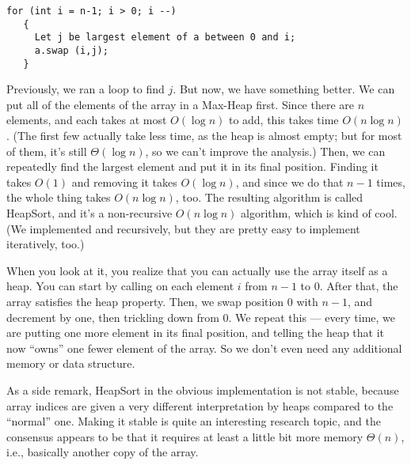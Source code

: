 \begin{verbatim}
for (int i = n-1; i > 0; i --)
   {
     Let j be largest element of a between 0 and i;
     a.swap (i,j);
   }
\end{verbatim}

Previously, we ran a loop to find $j$. 
But now, we have something better. We can put all of the elements of
the array in a Max-Heap first. Since there are $n$ elements, and each
takes at most $O(\log n)$ to add, this takes time $O(n \log n)$.
(The first few actually take less time, as the heap is almost empty;
but for most of them, it's still $\Theta(\log n)$, so we can't improve
the analysis.)
Then, we can repeatedly find the largest element and put it in its
final position. Finding it takes $O(1)$ and removing it takes $O(\log
n)$, and since we do that $n-1$ times, the whole thing takes 
$O(n \log n)$, too. The resulting algorithm is called HeapSort, and
it's a non-recursive $O(n \log n)$ algorithm, which is kind of cool.
(We implemented  and  recursively,
but they are pretty easy to implement iteratively, too.)

When you look at it, you realize that you can actually use the array
 itself as a heap. You can start by calling 
on each element $i$ from $n-1$ to $0$. After that, the array satisfies
the heap property. Then, we swap position $0$ with $n-1$, and
decrement  by one, then trickling down from 0. We repeat
this --- every time, we are putting one more element in its final
position, and telling the heap that it now ``owns'' one fewer element
of the array. So we don't even need any additional memory or data
structure.

As a side remark, HeapSort in the obvious implementation is not
stable, because array indices are given a very different
interpretation by heaps compared to the ``normal'' one.
Making it stable is quite an interesting research topic, and the
consensus appears to be that it requires at least a little bit more
memory $\Theta(n)$, i.e., basically another copy of the array. 